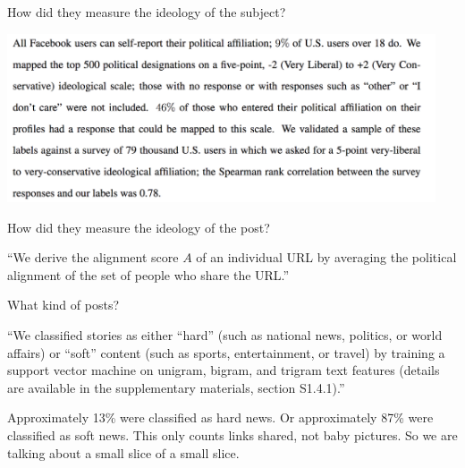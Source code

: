 \documentclass[aspectratio=169]{beamer}
\begin{document}
%
%
%
%
\begin{frame}

How did they measure the ideology of the subject?
\pause
\begin{center}
\includegraphics[width=0.95\textwidth]{figures/bakshy_exposure_2015_ego_political}
\end{center}


\end{frame}
\begin{frame}

How did they measure the ideology of the post?
\pause

``We derive the alignment score $A$ of an individual URL by averaging the political alignment of the set of people who share the URL.''


\end{frame}
\begin{frame}

What kind of posts?

\pause

``We classified stories as either ``hard'' (such as national news, politics, or world affairs) or ``soft'' content (such as sports, entertainment, or travel) by training a support vector machine on unigram, bigram, and trigram text features (details are available in the supplementary materials, section S1.4.1).''

Approximately 13\% were classified as hard news.  Or approximately 87\% were classified as soft news.  This only counts links shared, not baby pictures.  So we are talking about a small slice of a small slice.

\end{frame}
\end{document}
